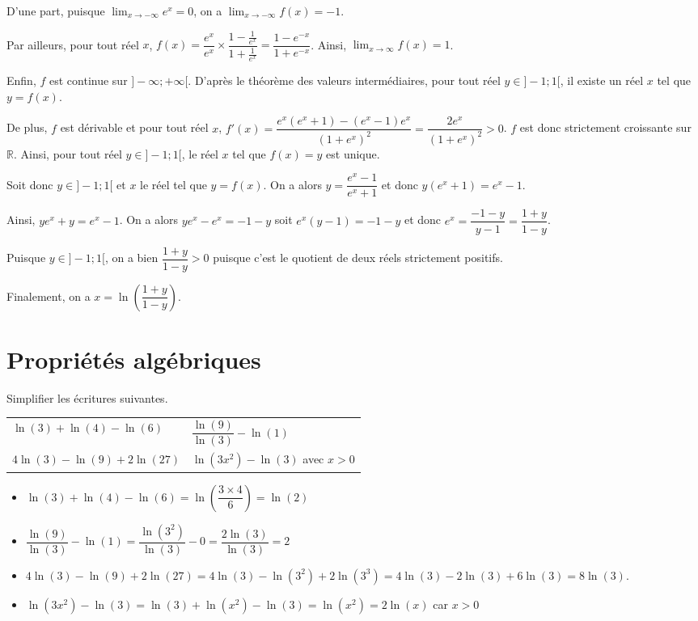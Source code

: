 \documentclass[11pt,fleqn, openany]{book} %
\begin{document}
\begin{solution}D'une part, puisque $\displaystyle\lim_{x \to - \infty}e^x=0$, on a $\displaystyle\lim_{x\to-\infty}f(x)=-1$. 

Par ailleurs, pour tout réel $x$, $f(x)=\dfrac{e^x}{e^x}\times \dfrac{1-\frac{1}{e^x}}{1+\frac{1}{e^x}}=\dfrac{1-e^{-x}}{1+e^{-x}}$. Ainsi, $\displaystyle\lim_{x\to \infty}f(x)=1$.

Enfin, $f$ est continue sur $]-\infty;+\infty[$. D'après le théorème des valeurs intermédiaires, pour tout réel $y\in]-1;1[$, il existe un réel $x$ tel que $y=f(x)$.

De plus, $f$ est dérivable et pour tout réel $x$, $f'(x)=\dfrac{e^x(e^x+1)-(e^x-1)e^x}{(1+e^x)^2}=\dfrac{2e^x}{(1+e^x)^2}>0$. $f$ est donc strictement croissante sur $\mathbb{R}$. Ainsi, pour tout réel $y\in ]-1;1[$, le réel $x$ tel que $f(x)=y$ est unique.

Soit donc $y\in]-1;1[$ et $x$ le réel tel que $y=f(x)$. On a alors $y=\dfrac{e^x-1}{e^x+1}$ et donc $y(e^x+1)=e^x-1$. 

Ainsi, $ye^x+y=e^x-1$. On a alors $ye^x-e^x=-1-y$ soit $e^x(y-1)=-1-y$ et donc $e^x=\dfrac{-1-y}{y-1}=\dfrac{1+y}{1-y}$. 

Puisque $y\in]-1;1[$, on a bien $\dfrac{1+y}{1-y}>0$ puisque c'est le quotient de deux réels strictement positifs. 

Finalement, on a $x=\ln\left(\dfrac{1+y}{1-y}\right)$.\end{solution}


\section*{Propriétés algébriques}

\begin{exercise}Simplifier les écritures suivantes.

\begin{tabularx}{0.9\linewidth}{XX}
$\ln(3)+\ln(4)-\ln(6)$ & $\dfrac{\ln(9)}{\ln(3)}-\ln(1)$ \\
$4\ln(3)-\ln(9)+2\ln(27)$ & $\ln(3x^2)-\ln(3)$ avec $x>0$
\end{tabularx}
\end{exercise}

\begin{solution}\hspace{0pt}
\begin{itemize}
\item $\ln(3)+\ln(4)-\ln(6) = \ln\left( \dfrac{3 \times 4}{6}\right)=\ln(2)$
\item $\dfrac{\ln(9)}{\ln(3)}-\ln(1)=\dfrac{\ln(3^2)}{\ln(3)}-0=\dfrac{2\ln(3)}{\ln(3)}=2$
\vskip5pt
\item $4\ln(3)-\ln(9)+2\ln(27)=4\ln(3)-\ln(3^2)+2\ln(3^3)=4\ln(3)-2\ln(3)+6\ln(3)=8\ln(3)$.
\vskip5pt
\item $\ln(3x^2)-\ln(3)=\ln(3)+\ln(x^2)-\ln(3)=\ln(x^2)=2\ln(x)$ car $x>0$
\end{itemize}\end{solution}
\end{document}

